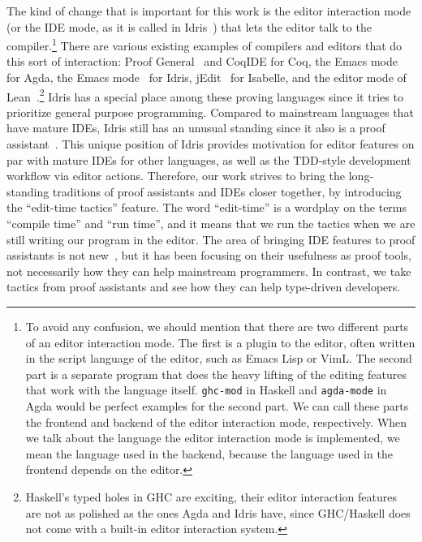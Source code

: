 The kind of change that is important for this work is the editor
interaction mode (or the IDE mode, as it is called in Idris~\cite{idris}) that
lets the editor talk to the compiler.\footnote{To avoid any confusion,
we should mention that there are two different parts of an editor interaction
mode. The first is a plugin to the editor, often written in the script language
of the editor, such as Emacs Lisp or VimL. The second part is a separate
program that does the heavy lifting of the editing features that work with the
language itself.  \texttt{ghc-mod} in Haskell and \texttt{agda-mode} in Agda would
be perfect examples for the second part. We can call these parts the frontend
and backend of the editor interaction mode, respectively.  When we talk about
the language the editor interaction mode is implemented, we mean the language
used in the backend, because the language used in the frontend depends on the
editor.}
There are various existing examples of compilers and editors that do this sort
of interaction:
Proof General~\cite{pg} and CoqIDE for Coq,
the Emacs mode~\cite{agdamode} for Agda,
the Emacs mode~\cite{idrismode} for Idris,
jEdit~\cite{isabellejedit} for Isabelle,
and the editor mode of Lean~\cite{lean}.\footnote{Haskell's typed holes in GHC
are exciting, their editor interaction features are not as polished as the ones
Agda and Idris have, since GHC/Haskell does not come with a built-in editor
interaction system.}
Idris has a special place among these proving languages since it tries to
prioritize general purpose programming. Compared to mainstream languages
that have mature IDEs, Idris still has an unusual standing since it also is a
proof assistant~\cite{idrisfaq}.
This unique position of Idris provides motivation for editor features on par
with mature IDEs for other languages, as well as the TDD-style development
workflow via editor actions.
Therefore, our work strives to bring the long-standing traditions of proof
assistants and IDEs closer together, by introducing the ``edit-time tactics''
feature.  The word ``edit-time'' is a wordplay on the terms ``compile time''
and ``run time'', and it means that we run the tactics when we are still
writing our program in the editor.
The area of bringing IDE features to proof assistants is not new~\cite{ctcoq,
developingReuse, realTheoremProvers, toolSupport}, but it has been focusing
on their usefulness as proof tools, not necessarily how they can help
mainstream programmers. In contrast, we take tactics from proof assistants
and see how they can help type-driven developers.


